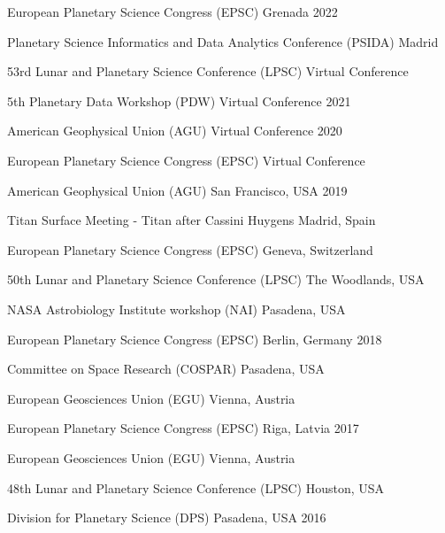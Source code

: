
\begin{cvhonors}

    \cvhonor
    {European Planetary Science Congress (EPSC)}
    {}
    {Grenada}
    {2022}

    \cvhonor
    {Planetary Science Informatics and Data Analytics Conference (PSIDA)}
    {}
    {Madrid}
    {}

    \cvhonor
    {53rd Lunar and Planetary Science Conference (LPSC)}
    {}
    {Virtual Conference}
    {}

    \cvhonor
    {5th Planetary Data Workshop (PDW)}
    {}
    {Virtual Conference}
    {2021}

    \cvhonor
    {American Geophysical Union (AGU)}
    {}
    {Virtual Conference}
    {2020}

    \cvhonor
    {European Planetary Science Congress (EPSC)}
    {}
    {Virtual Conference}
    {}

    \cvhonor
    {American Geophysical Union (AGU)}
    {}
    {San Francisco, USA}
    {2019}

    \cvhonor
    {Titan Surface Meeting - Titan after Cassini Huygens}
    {}
    {Madrid, Spain}
    {}

    \cvhonor
    {European Planetary Science Congress (EPSC)}
    {}
    {Geneva, Switzerland}
    {}

    \cvhonor
    {50th Lunar and Planetary Science Conference (LPSC)}
    {}
    {The Woodlands, USA}
    {}

    \cvhonor
    {NASA Astrobiology Institute workshop (NAI)}
    {}
    {Pasadena, USA}
    {}

    \cvhonor
    {European Planetary Science Congress (EPSC)}
    {}
    {Berlin, Germany}
    {2018}

    \cvhonor
    {Committee on Space Research (COSPAR)}
    {}
    {Pasadena, USA}
    {}

    \cvhonor
    {European Geosciences Union (EGU)}
    {}
    {Vienna, Austria}
    {}

    \cvhonor
    {European Planetary Science Congress (EPSC)}
    {}
    {Riga, Latvia}
    {2017}

  \cvhonor
    {European Geosciences Union (EGU)}
    {}
    {Vienna, Austria}
    {}

  \cvhonor
    {48th Lunar and Planetary Science Conference (LPSC)}
    {}
    {Houston, USA}
    {}

  \cvhonor
    {Division for Planetary Science (DPS)}
    {}
    {Pasadena, USA}
    {2016}


\end{cvhonors}
